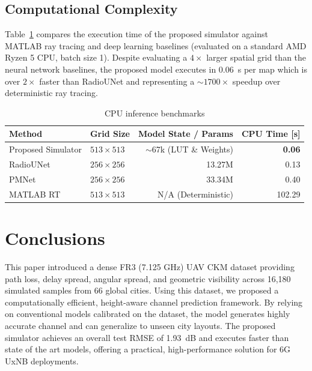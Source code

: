 \documentclass[10pt,conference,letterpaper]{IEEEtran}
\begin{document}
\subsection{Computational Complexity}
Table~\ref{tab:compute} compares the execution time of the proposed simulator against MATLAB ray tracing and deep learning baselines (evaluated on a standard AMD Ryzen 5 CPU, batch size 1). Despite evaluating a $4\times$ larger spatial grid than the neural network baselines, the proposed model executes in \SI{0.06}{s} per map which is over $2\times$ faster than RadioUNet and representing a $\sim$$1700\times$ speedup over deterministic ray tracing.

\begin{table}[t]
\centering
\caption{CPU inference benchmarks}
\label{tab:compute}
\scriptsize
\begin{tabular}{@{}llrr@{}}
\toprule
Method & Grid Size & Model State / Params & CPU Time [s] \\
\midrule
Proposed Simulator & $513 \times 513$ & $\sim$67k (LUT \& Weights) & \textbf{0.06} \\
RadioUNet~\cite{radiounet2020} & $256 \times 256$ & 13.27M & 0.13 \\
PMNet~\cite{pmnet2023} & $256 \times 256$ & 33.34M & 0.40 \\
MATLAB RT & $513 \times 513$ & N/A (Deterministic) & 102.29 \\
\bottomrule
\end{tabular}
\end{table}

\section{Conclusions}\label{sec:conclusions}
This paper introduced a dense FR3 (7.125 GHz) UAV CKM dataset providing path loss, delay spread, angular spread, and geometric visibility across 16,180 simulated samples from 66 global cities. Using this dataset, we proposed a computationally efficient, height-aware channel prediction framework. By relying on conventional models calibrated on the dataset, the model generates highly accurate channel and can generalize to unseen city layouts. The proposed simulator achieves an overall test RMSE of \SI{1.93}{dB} and executes faster than state of the art models, offering a practical, high-performance solution for 6G UxNB deployments.



\end{document}
